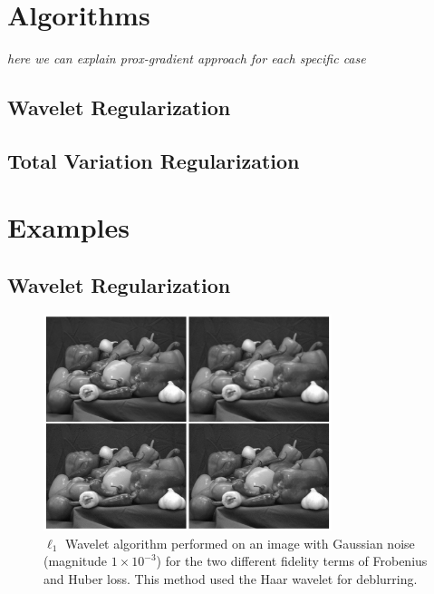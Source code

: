 \documentclass[10pt,a4paper]{article}
\begin{document}
\section{Algorithms}

\emph{here we can explain prox-gradient approach for each specific case}

\subsection{Wavelet Regularization}

\subsection{Total Variation Regularization}

\section{Examples}

\subsection{Wavelet Regularization}


\begin{figure}[H]
\begin{center}
\includegraphics[width = 0.75\textwidth]{../figures/waveletGaussH.pdf} 
\end{center}
\caption{$\ell_1$ Wavelet algorithm performed on an image with Gaussian noise (magnitude $1 \times 10^{-3}$) for the two different fidelity terms of Frobenius and Huber loss. This method used the Haar wavelet for deblurring.}
\label{waveletH_gauss}
\end{figure}
\end{document}
